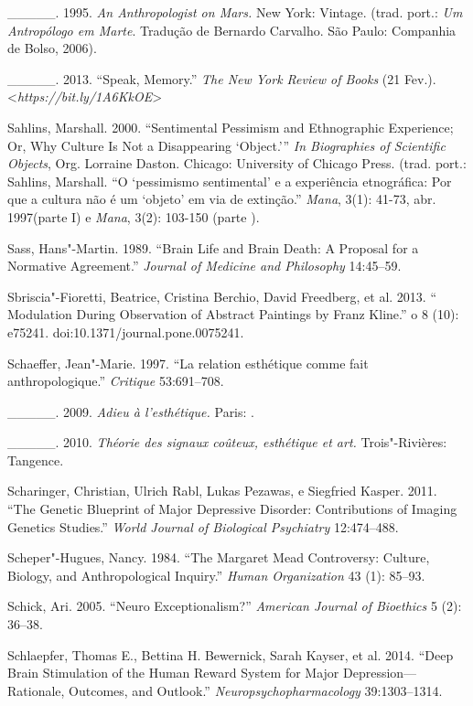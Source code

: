{\begin{Parskip}
\_\_\_\_\_. 1995. \emph{An Anthropologist on Mars.} New York: Vintage.
(trad. port.: \emph{Um Antropólogo em Marte}. Tradução de Bernardo
Carvalho. São Paulo: Companhia de Bolso, 2006).

\_\_\_\_\_. 2013. ``Speak, Memory.'' \emph{The New York Review of Books}
(21 Fev.).
\textless{}\emph{https://bit.ly/1A6KkOE}\textgreater{}

Sahlins, Marshall. 2000. ``Sentimental Pessimism and Ethnographic
Experience; Or, Why Culture Is Not a Disappearing `Object.''' \emph{In
Biographies of Scientific Objects}, Org. Lorraine Daston. Chicago:
University of Chicago Press. (trad. port.: Sahlins, Marshall. ``O
`pessimismo sentimental' e a experiência etnográfica: Por que a cultura
não é um `objeto' em via de extinção.'' \emph{Mana}, 3(1): 41-73, abr.
1997(parte I) e \emph{Mana}, 3(2): 103-150 (parte ).

Sass, Hans"-Martin. 1989. ``Brain Life and Brain Death: A Proposal for a
Normative Agreement.'' \emph{Journal of Medicine and Philosophy}
14:45--59.

Sbriscia"-Fioretti, Beatrice, Cristina Berchio, David Freedberg, et al.
2013. `` Modulation During Observation of Abstract Paintings by Franz
Kline.'' o 8 (10): e75241. doi:10.1371/journal.pone.0075241.

Schaeffer, Jean"-Marie. 1997. ``La relation esthétique comme fait
anthropologique.'' \emph{Critique} 53:691--708.

\_\_\_\_\_. 2009. \emph{Adieu à l'esthétique.} Paris: .

\_\_\_\_\_. 2010. \emph{Théorie des signaux coûteux, esthétique et art.}
Trois"-Rivières: Tangence.

Scharinger, Christian, Ulrich Rabl, Lukas Pezawas, e Siegfried Kasper.
2011. ``The Genetic Blueprint of Major Depressive Disorder:
Contributions of Imaging Genetics Studies.'' \emph{World Journal of
Biological Psychiatry} 12:474--488.

Scheper"-Hugues, Nancy. 1984. ``The Margaret Mead Controversy: Culture,
Biology, and Anthropological Inquiry.'' \emph{Human Organization} 43
(1): 85--93.

Schick, Ari. 2005. ``Neuro Exceptionalism?'' \emph{American Journal of
Bioethics} 5 (2): 36--38.

Schlaepfer, Thomas E., Bettina H. Bewernick, Sarah Kayser, et al. 2014.
``Deep Brain Stimulation of the Human Reward System for Major
Depression---Rationale, Outcomes, and Outlook.''
\emph{Neuropsychopharmacology} 39:1303--1314.


\end{Parskip}}
